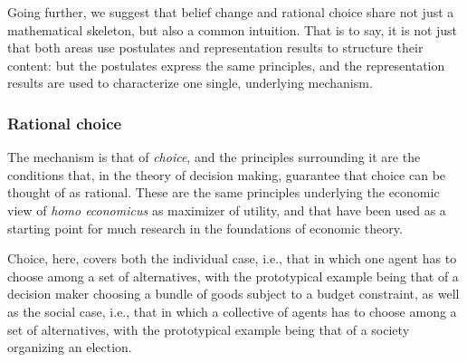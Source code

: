 Going further, we suggest that belief change and rational choice
share not just a mathematical skeleton, but also a common intuition.
That is to say, it is not just that both areas use postulates and 
representation results to structure their content:
but the postulates express the same principles,
and the representation results are used to characterize
one single, underlying mechanism.

\subsubsection{Rational choice}
The mechanism is that of \emph{choice}, 
and the principles surrounding it are 
the conditions that, in the theory of decision making,  
guarantee that choice can be thought of as rational.
These are the same principles underlying
the economic view of \emph{homo economicus} 
as maximizer of utility,
and that have been used as a 
starting point for much research in
the foundations of economic theory.

Choice, here, covers both the individual case,
i.e., that in which one agent has to choose among a set of alternatives,
with the prototypical example being that of a 
decision maker choosing a bundle of goods
subject to a budget constraint,
as well as the social case,
i.e., that in which a collective of agents 
has to choose among a set of alternatives,
with the prototypical example being that 
of a society organizing an election.

